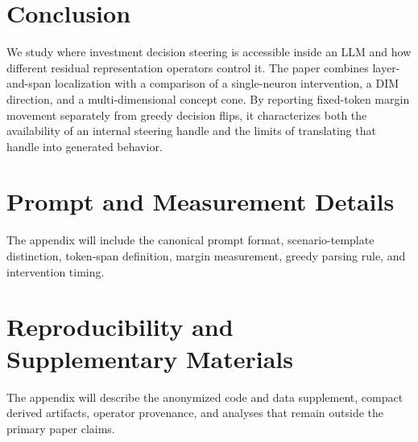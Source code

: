 \documentclass[11pt]{article}
\begin{document}
\section{Conclusion}

We study where investment decision steering is accessible inside an LLM and how different residual
representation operators control it. The paper combines layer-and-span localization with a comparison
of a single-neuron intervention, a DIM direction, and a multi-dimensional concept cone. By reporting
fixed-token margin movement separately from greedy decision flips, it characterizes both the
availability of an internal steering handle and the limits of translating that handle into generated
behavior.

\appendix

\section{Prompt and Measurement Details}

The appendix will include the canonical prompt format, scenario-template distinction, token-span
definition, margin measurement, greedy parsing rule, and intervention timing.

\section{Reproducibility and Supplementary Materials}

The appendix will describe the anonymized code and data supplement, compact derived artifacts,
operator provenance, and analyses that remain outside the primary paper claims.



\end{document}
